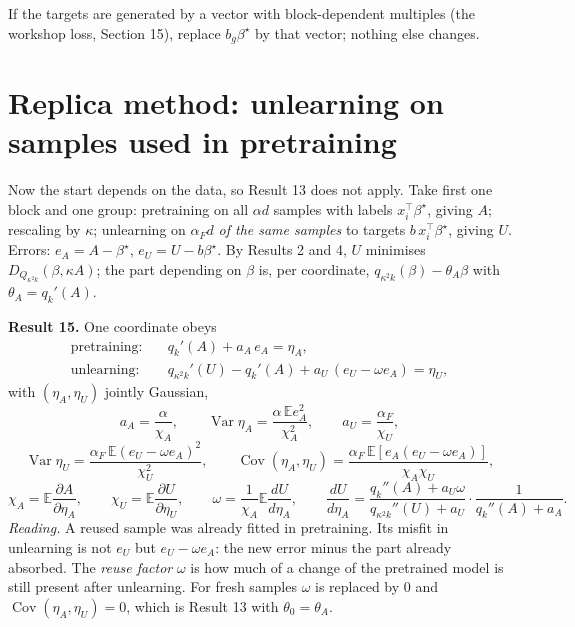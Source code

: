 \documentclass[10pt]{article}
\newcommand{\bs}{\beta^\star}\newcommand{\E}{\mathbb E}\newcommand{\asinh}{\operatorname{arcsinh}}\newcommand{\sk}{\sqrt k}
\begin{document}
If the targets are generated by a vector with block-dependent multiples (the workshop loss, Section 15), replace $b_g\bs$ by that vector; nothing else changes.

\section{Replica method: unlearning on samples used in pretraining}\label{rep2}
Now the start depends on the data, so Result 13 does not apply. Take first one block and one group: pretraining on all $\alpha d$ samples with labels $x_i^\top\bs$, giving $A$; rescaling by $\kappa$; unlearning on $\alpha_Fd$ \emph{of the same samples} to targets $b\,x_i^\top\bs$, giving $U$. Errors: $e_A=A-\bs$, $e_U=U-b\bs$. By Results 2 and 4, $U$ minimises $D_{Q_{\kappa^2k}}(\beta,\kappa A)$; the part depending on $\beta$ is, per coordinate, $q_{\kappa^2k}(\beta)-\theta_A\beta$ with $\theta_A=q_k'(A)$.

\textbf{Result 15.} One coordinate obeys
\begin{align}
\text{pretraining:}&\quad q_k'(A)+a_A\,e_A=\eta_A,\label{s1}\\
\text{unlearning:}&\quad q_{\kappa^2k}'(U)-q_k'(A)+a_U\,(e_U-\omega e_A)=\eta_U,\label{s2}
\end{align}
with $(\eta_A,\eta_U)$ jointly Gaussian,
\[
a_A=\frac\alpha{\chi_A},\qquad\operatorname{Var}\eta_A=\frac{\alpha\,\E e_A^2}{\chi_A^2},\qquad a_U=\frac{\alpha_F}{\chi_U},
\]
\[
\operatorname{Var}\eta_U=\frac{\alpha_F\,\E(e_U-\omega e_A)^2}{\chi_U^2},\qquad\operatorname{Cov}(\eta_A,\eta_U)=\frac{\alpha_F\,\E[e_A(e_U-\omega e_A)]}{\chi_A\chi_U},
\]
\[
\chi_A=\E\frac{\partial A}{\partial\eta_A},\qquad\chi_U=\E\frac{\partial U}{\partial\eta_U},\qquad\omega=\frac1{\chi_A}\E\frac{dU}{d\eta_A},\qquad\frac{dU}{d\eta_A}=\frac{q_k''(A)+a_U\omega}{q_{\kappa^2k}''(U)+a_U}\cdot\frac1{q_k''(A)+a_A}.
\]
\emph{Reading.} A reused sample was already fitted in pretraining. Its misfit in unlearning is not $e_U$ but $e_U-\omega e_A$: the new error minus the part already absorbed. The \emph{reuse factor} $\omega$ is how much of a change of the pretrained model is still present after unlearning. For fresh samples $\omega$ is replaced by $0$ and $\operatorname{Cov}(\eta_A,\eta_U)=0$, which is Result 13 with $\theta_0=\theta_A$.
\end{document}
